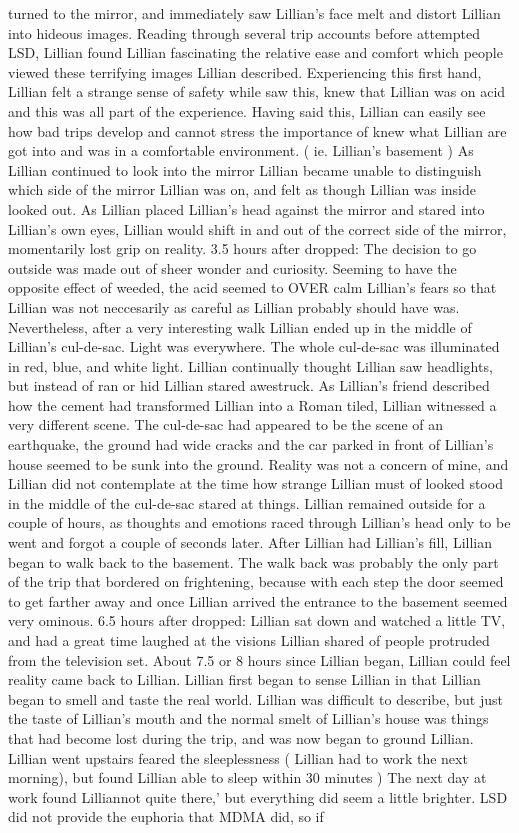 \documentclass[12pt]{book}
\begin{document}
turned to the mirror, and immediately saw Lillian's face melt and distort Lillian into hideous images. Reading through several trip accounts before attempted LSD, Lillian found Lillian fascinating the relative ease and comfort which people viewed these terrifying images Lillian described. Experiencing this first hand, Lillian felt a strange sense of safety while saw this, knew that Lillian was on acid and this was all part of the experience. Having said this, Lillian can easily see how bad trips develop and cannot stress the importance of knew what Lillian are got into and was in a comfortable environment. ( ie. Lillian's basement ) As Lillian continued to look into the mirror Lillian became unable to distinguish which side of the mirror Lillian was on, and felt as though Lillian was inside looked out. As Lillian placed Lillian's head against the mirror and stared into Lillian's own eyes, Lillian would shift in and out of the correct side of the mirror, momentarily lost grip on reality. 3.5 hours after dropped: The decision to go outside was made out of sheer wonder and curiosity. Seeming to have the opposite effect of weeded, the acid seemed to OVER calm Lillian's fears so that Lillian was not neccesarily as careful as Lillian probably should have was. Nevertheless, after a very interesting walk Lillian ended up in the middle of Lillian's cul-de-sac. Light was everywhere. The whole cul-de-sac was illuminated in red, blue, and white light. Lillian continually thought Lillian saw headlights, but instead of ran or hid Lillian stared awestruck. As Lillian's friend described how the cement had transformed Lillian into a Roman tiled, Lillian witnessed a very different scene. The cul-de-sac had appeared to be the scene of an earthquake, the ground had wide cracks and the car parked in front of Lillian's house seemed to be sunk into the ground. Reality was not a concern of mine, and Lillian did not contemplate at the time how strange Lillian must of looked stood in the middle of the cul-de-sac stared at things. Lillian remained outside for a couple of hours, as thoughts and emotions raced through Lillian's head only to be went and forgot a couple of seconds later. After Lillian had Lillian's fill, Lillian began to walk back to the basement. The walk back was probably the only part of the trip that bordered on frightening, because with each step the door seemed to get farther away and once Lillian arrived the entrance to the basement seemed very ominous. 6.5 hours after dropped: Lillian sat down and watched a little TV, and had a great time laughed at the visions Lillian shared of people protruded from the television set. About 7.5 or 8 hours since Lillian began, Lillian could feel reality came back to Lillian. Lillian first began to sense Lillian in that Lillian began to smell and taste the real world. Lillian was difficult to describe, but just the taste of Lillian's mouth and the normal smelt of Lillian's house was things that had become lost during the trip, and was now began to ground Lillian. Lillian went upstairs feared the sleeplessness ( Lillian had to work the next morning), but found Lillian able to sleep within 30 minutes ) The next day at work found Lilliannot quite there,' but everything did seem a little brighter. LSD did not provide the euphoria that MDMA did, so if 
\end{document}
